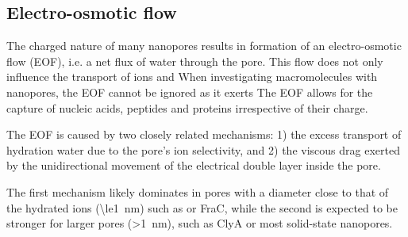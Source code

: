 \documentclass[journal=ancac3,manuscript=article,etalmode=truncate,maxauthors=0,layout=twocolumn]{achemso}
\begin{document}


%

\subsection{Electro-osmotic flow}\label{sec:eof}




The charged nature of many nanopores results in formation of an electro-osmotic flow (EOF), i.e. a net flux of water through the pore. This flow does not only influence the transport of ions and When investigating macromolecules with nanopores, the EOF cannot be ignored as it exerts The EOF allows for the capture of nucleic acids\cite{Wong-2007}, peptides\cite{Huang-2017} and proteins \cite{Soskine-2012,Soskine-2013,VanMeervelt-2014,Soskine-Biesemans-2015,Biesemans-Soskine-2015,Wloka-2017} irrespective of their charge.

The EOF is caused by two closely related mechanisms: 1) the excess transport of hydration water due to the pore's ion selectivity, and 2) the viscous drag exerted by the unidirectional movement of the electrical double layer inside the pore.


The first mechanism likely dominates in pores with a diameter close to that of the hydrated ions (\SI{\le1}{\nm}) such as \ahl\cite{} or FraC,\cite{Huang-2017} while the second is expected to be stronger for larger pores (\SI{>1}{\nm}), such as ClyA\cite{Soskine-2012} or most solid-state nanopores.
\end{document}
